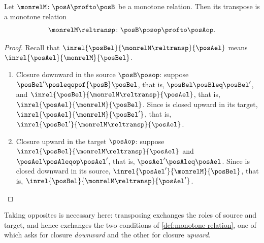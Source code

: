 \begin{lemma}
    \label{lem:monrel-transpose}
    Let $\monrelM \colon \posA \profto \posB$ be a monotone relation.
    Then its transpose is a monotone relation
    \begin{equation}
        \monrelM\reltransp \colon \posB\posop \profto \posAop.
    \end{equation}
\end{lemma}
\begin{proof}
    Recall that $\inrel{\posBel}{\monrelM\reltransp}{\posAel}$ means $\inrel{\posAel}{\monrelM}{\posBel}$.
    \begin{enumerate}
        \item Closure downward in the source $\posB\posop$: suppose $\posBel' \posleqopof{\posB} \posBel$, that is, $\posBel \posBleq \posBel'$, and $\inrel{\posBel}{\monrelM\reltransp}{\posAel}$, that is, $\inrel{\posAel}{\monrelM}{\posBel}$.
              Since \monrelM is closed upward in its target, $\inrel{\posAel}{\monrelM}{\posBel'}$, that is, $\inrel{\posBel'}{\monrelM\reltransp}{\posAel}$.
        \item Closure upward in the target $\posAop$: suppose $\inrel{\posBel}{\monrelM\reltransp}{\posAel}$ and $\posAel \posAleqop \posAel'$, that is, $\posAel' \posAleq \posAel$.
              Since \monrelM is closed downward in its source, $\inrel{\posAel'}{\monrelM}{\posBel}$, that is, $\inrel{\posBel}{\monrelM\reltransp}{\posAel'}$.
    \end{enumerate}
\end{proof}

Taking opposites is necessary here: transposing exchanges the roles of source and target, and hence exchanges the two conditions of \cref{def:monotone-relation}, one of which asks for closure \emph{downward} and the other for closure \emph{upward}.

